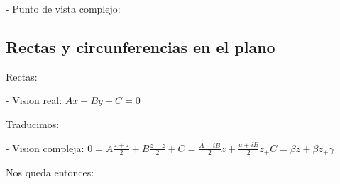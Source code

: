 
- Punto de vista complejo:


\subsection{Rectas y circunferencias en el plano}

Rectas:

- Vision real: \(Ax + By + C = 0\)

Traducimos:

- Vision compleja: \(0 = A \frac{z+z}{2}+B \frac{z-z}{2} + C = \frac{A-iB}{2}z+\frac{a+iB}{2}z_ + C = \beta z + \beta z_ + \gamma \) 

Nos queda entonces:








